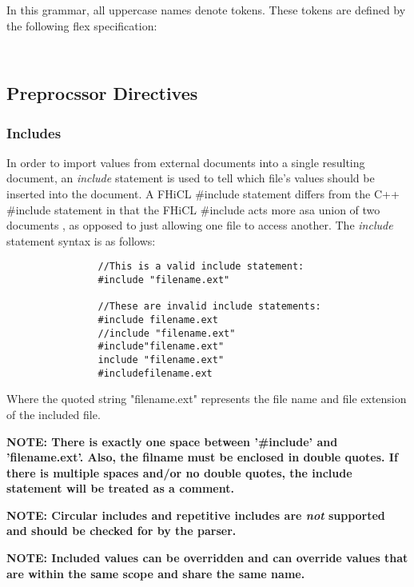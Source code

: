 \documentclass{article}
\begin{document}
	In this grammar,
	all uppercase names denote tokens.
	These tokens are defined by the following flex specification:
	\begin{verbatim}
	
	\end{verbatim}

	\subsection{Preprocssor Directives}
		\subsubsection{Includes}
			In order to import values from external documents into a single resulting document,
			an \emph{include} statement is used to tell which file's values should be inserted into the document.
			A FHiCL \#include statement differs from the C++ \#include statement 
			in that the FHiCL \#include acts 
			more asa union of two documents
			, as opposed to just allowing one file to access another.
			The \emph{include} statement syntax is as follows:
			\begin{verbatim}
				//This is a valid include statement:
				#include "filename.ext"
				
				//These are invalid include statements:
				#include filename.ext
				//include "filename.ext"
				#include"filename.ext"
				include "filename.ext"
				#includefilename.ext
			\end{verbatim}
			\vspace{1mm}
			\par
			Where the quoted string "filename.ext" represents the file name and file extension of the included file.
			\vspace{1mm}
			\par
			\bf NOTE: \rm There is exactly one space between '\#include' and 'filename.ext'.
			Also, the filname must be enclosed in double quotes.
			If there is multiple spaces and/or no double quotes, 
			the include statement will be treated as a comment.
			\par
			\bf NOTE: \rm Circular includes 
			and repetitive includes 
			are \emph{not} supported and should be checked for by the parser.
			\par
			\bf NOTE: \rm Included values can be overridden
				and can override values that are within the same scope
				and share the same name.	
\end{document}
